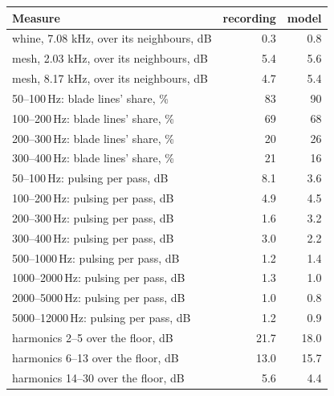 \begin{tabular}{@{}lrr@{}}
\toprule
Measure & recording & model \\
\midrule
whine, 7.08 kHz, over its neighbours, dB & 0.3 & 0.8 \\
mesh, 2.03 kHz, over its neighbours, dB & 5.4 & 5.6 \\
mesh, 8.17 kHz, over its neighbours, dB & 4.7 & 5.4 \\
50--100\,Hz: blade lines' share, \% & 83 & 90 \\
100--200\,Hz: blade lines' share, \% & 69 & 68 \\
200--300\,Hz: blade lines' share, \% & 20 & 26 \\
300--400\,Hz: blade lines' share, \% & 21 & 16 \\
50--100\,Hz: pulsing per pass, dB & 8.1 & 3.6 \\
100--200\,Hz: pulsing per pass, dB & 4.9 & 4.5 \\
200--300\,Hz: pulsing per pass, dB & 1.6 & 3.2 \\
300--400\,Hz: pulsing per pass, dB & 3.0 & 2.2 \\
500--1000\,Hz: pulsing per pass, dB & 1.2 & 1.4 \\
1000--2000\,Hz: pulsing per pass, dB & 1.3 & 1.0 \\
2000--5000\,Hz: pulsing per pass, dB & 1.0 & 0.8 \\
5000--12000\,Hz: pulsing per pass, dB & 1.2 & 0.9 \\
harmonics 2--5 over the floor, dB & 21.7 & 18.0 \\
harmonics 6--13 over the floor, dB & 13.0 & 15.7 \\
harmonics 14--30 over the floor, dB & 5.6 & 4.4 \\
\bottomrule
\end{tabular}
